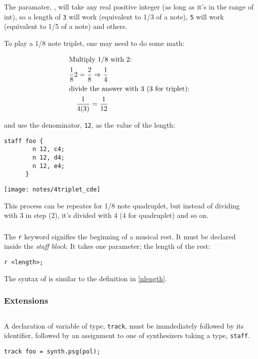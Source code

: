 \np The paramater, , will take any real positive integer (as long as it's in the range of int),
so a length of \verb+3+ will work (equivalent to 1/3 of a note), \verb+5+ will work (equivalent to 1/5
of a note) and others.

\np To play a 1/8 note triplet, one may need to do some math:

\begin{align}
	\shortintertext{Multiply 1/8 with 2:}
	\frac{1}{8}2 = \frac{2}{8} \Rightarrow \frac{1}{4} \\
	\shortintertext{divide the answer with 3 (3 for triplet):}
	\frac{1}{4(3)} = \frac{1}{12}
\end{align}

and use the denominator, \verb+12+, as the value of the length:
\begin{Verbatim}[frame=single]
      staff foo {
        n 12, c4;
        n 12, d4;
        n 12, e4;
      }
\end{Verbatim}

\begin{center}
\texttt{[image: notes/4triplet\_cde]}
\end{center}

This process can be repeates for 1/8 note quadruplet, but instead of dividing
with 3 in step (2), it's divided with 4 (4 for quadruplet) and so on.


\subsubsection{}

\np The \verb+r+ keyword signifies the beginning of a musical rest. It must be
declared inside the \textit{staff block}. It takes one parameter; the
length of the rest:

\begin{Verbatim}[frame=single]
      r <length>;
\end{Verbatim}

\np The syntax of  is similar to the definition in 
\autoref{nlength}.

\subsubsection{Extensions}

\subsection{}
\np A declaration of variable of type,
\verb+track+, must be immdediately followed by its identifier, followed by
an assignment to one of synthesizers taking a type, \verb+staff+. 
\begin{Verbatim}[frame=single]
       track foo = synth.psg(pol);
\end{Verbatim}

